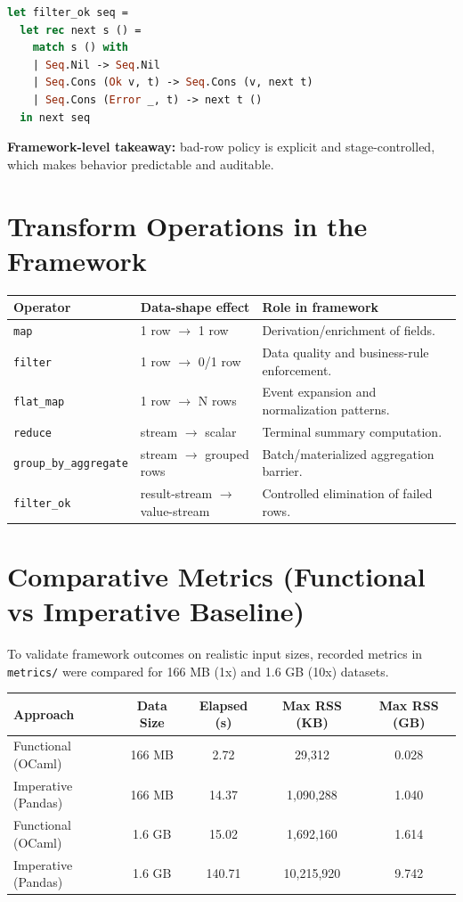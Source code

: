 \documentclass[11pt,a4paper]{article}
\begin{document}
\begin{lstlisting}[style=compact, language=Caml]
let filter_ok seq =
  let rec next s () =
    match s () with
    | Seq.Nil -> Seq.Nil
    | Seq.Cons (Ok v, t) -> Seq.Cons (v, next t)
    | Seq.Cons (Error _, t) -> next t ()
  in next seq
\end{lstlisting}

\textbf{Framework-level takeaway:} bad-row policy is explicit and stage-controlled, which makes behavior predictable and auditable.

\section{Transform Operations in the Framework}
\begin{table}[h]
\centering
\small
\begin{tabular}{p{2.3cm}p{4.0cm}p{6.4cm}}
\toprule
\textbf{Operator} & \textbf{Data-shape effect} & \textbf{Role in framework} \\
\midrule
\texttt{map} & 1 row $\rightarrow$ 1 row & Derivation/enrichment of fields. \\
\texttt{filter} & 1 row $\rightarrow$ 0/1 row & Data quality and business-rule enforcement. \\
\texttt{flat\_map} & 1 row $\rightarrow$ N rows & Event expansion and normalization patterns. \\
\texttt{reduce} & stream $\rightarrow$ scalar & Terminal summary computation. \\
\texttt{group\_by\_aggregate} & stream $\rightarrow$ grouped rows & Batch/materialized aggregation barrier. \\
\texttt{filter\_ok} & result-stream $\rightarrow$ value-stream & Controlled elimination of failed rows. \\
\bottomrule
\end{tabular}
\end{table}

\section{Comparative Metrics (Functional vs Imperative Baseline)}
To validate framework outcomes on realistic input sizes, recorded metrics in \texttt{metrics/} were compared for 166 MB (1x) and 1.6 GB (10x) datasets.

\begin{table}[h]
\centering
\small
\begin{tabular}{lcccc}
\toprule
\textbf{Approach} & \textbf{Data Size} & \textbf{Elapsed (s)} & \textbf{Max RSS (KB)} & \textbf{Max RSS (GB)} \\
\midrule
Functional (OCaml) & 166 MB & 2.72 & 29,312 & 0.028 \\
Imperative (Pandas) & 166 MB & 14.37 & 1,090,288 & 1.040 \\
Functional (OCaml) & 1.6 GB & 15.02 & 1,692,160 & 1.614 \\
Imperative (Pandas) & 1.6 GB & 140.71 & 10,215,920 & 9.742 \\
\bottomrule
\end{tabular}
\end{table}
\end{document}
